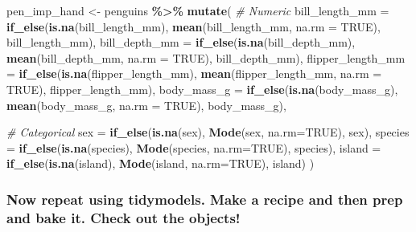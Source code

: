 \documentclass[
]{article}
\newenvironment{Shaded}{\begin{snugshade}}{\end{snugshade}}
\newcommand{\AttributeTok}[1]{\textcolor[rgb]{0.13,0.29,0.53}{#1}}
\newcommand{\CommentTok}[1]{\textcolor[rgb]{0.56,0.35,0.01}{\textit{#1}}}
\newcommand{\ConstantTok}[1]{\textcolor[rgb]{0.56,0.35,0.01}{#1}}
\newcommand{\FunctionTok}[1]{\textcolor[rgb]{0.13,0.29,0.53}{\textbf{#1}}}
\newcommand{\NormalTok}[1]{#1}
\newcommand{\OtherTok}[1]{\textcolor[rgb]{0.56,0.35,0.01}{#1}}
\newcommand{\SpecialCharTok}[1]{\textcolor[rgb]{0.81,0.36,0.00}{\textbf{#1}}}
\begin{document}
\begin{Shaded}
\begin{Highlighting}[]
\NormalTok{pen\_imp\_hand }\OtherTok{\textless{}{-}}\NormalTok{ penguins }\SpecialCharTok{\%\textgreater{}\%} 
  \FunctionTok{mutate}\NormalTok{(}
    \CommentTok{\# Numeric}
    \AttributeTok{bill\_length\_mm =} \FunctionTok{if\_else}\NormalTok{(}\FunctionTok{is.na}\NormalTok{(bill\_length\_mm), }\FunctionTok{mean}\NormalTok{(bill\_length\_mm, }\AttributeTok{na.rm =} \ConstantTok{TRUE}\NormalTok{), bill\_length\_mm),}
    \AttributeTok{bill\_depth\_mm =} \FunctionTok{if\_else}\NormalTok{(}\FunctionTok{is.na}\NormalTok{(bill\_depth\_mm), }\FunctionTok{mean}\NormalTok{(bill\_depth\_mm, }\AttributeTok{na.rm =} \ConstantTok{TRUE}\NormalTok{), bill\_depth\_mm),}
    \AttributeTok{flipper\_length\_mm =} \FunctionTok{if\_else}\NormalTok{(}\FunctionTok{is.na}\NormalTok{(flipper\_length\_mm), }\FunctionTok{mean}\NormalTok{(flipper\_length\_mm, }\AttributeTok{na.rm =} \ConstantTok{TRUE}\NormalTok{), flipper\_length\_mm),}
    \AttributeTok{body\_mass\_g =} \FunctionTok{if\_else}\NormalTok{(}\FunctionTok{is.na}\NormalTok{(body\_mass\_g), }\FunctionTok{mean}\NormalTok{(body\_mass\_g, }\AttributeTok{na.rm =} \ConstantTok{TRUE}\NormalTok{), body\_mass\_g),}
    
    \CommentTok{\# Categorical}
    \AttributeTok{sex =} \FunctionTok{if\_else}\NormalTok{(}\FunctionTok{is.na}\NormalTok{(sex), }\FunctionTok{Mode}\NormalTok{(sex, }\AttributeTok{na.rm=}\ConstantTok{TRUE}\NormalTok{), sex),}
    \AttributeTok{species =} \FunctionTok{if\_else}\NormalTok{(}\FunctionTok{is.na}\NormalTok{(species), }\FunctionTok{Mode}\NormalTok{(species, }\AttributeTok{na.rm=}\ConstantTok{TRUE}\NormalTok{), species),}
    \AttributeTok{island =} \FunctionTok{if\_else}\NormalTok{(}\FunctionTok{is.na}\NormalTok{(island), }\FunctionTok{Mode}\NormalTok{(island, }\AttributeTok{na.rm=}\ConstantTok{TRUE}\NormalTok{), island)}
\NormalTok{  )}
\end{Highlighting}
\end{Shaded}

\subsubsection{Now repeat using tidymodels. Make a recipe and then prep
and bake it. Check out the
objects!}\label{now-repeat-using-tidymodels.-make-a-recipe-and-then-prep-and-bake-it.-check-out-the-objects}
\end{document}
